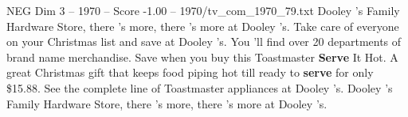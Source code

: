 \begin{textsample}{NEG Dim 3 – 1970 – Score -1.00 – 1970/tv\_com\_1970\_79.txt}  \label{ex:f3_neg_064}
Dooley 's Family Hardware Store, there 's more, there 's more at Dooley 's.
Take care of everyone on your Christmas list and save at Dooley 's.
You 'll find over 20 departments of brand name merchandise.
Save when you buy this Toastmaster \textbf{Serve} It Hot.
A great Christmas gift that keeps food piping hot till ready to \textbf{serve} for only \$15.88.
See the complete line of Toastmaster appliances at Dooley 's.
Dooley 's Family Hardware Store, there 's more, there 's more at Dooley 's.

\end{textsample}
